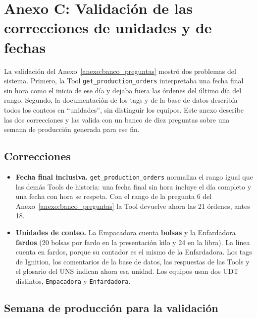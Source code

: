 \section*{Anexo C: Validación de las correcciones de unidades y de fechas}
{}
\makeatletter{}\makeatother
\label{anexo:validacion_correcciones}

\begin{singlespace}
\setlength{\parskip}{0.5em}

La validación del Anexo~\ref{anexo:banco_preguntas} mostró dos problemas del sistema. Primero, la Tool \texttt{get\_production\_orders} interpretaba una fecha final sin hora como el inicio de ese día y dejaba fuera las órdenes del último día del rango. Segundo, la documentación de los tags y de la base de datos describía todos los conteos en ``unidades'', sin distinguir los equipos. Este anexo describe las dos correcciones y las valida con un banco de diez preguntas sobre una semana de producción generada para ese fin.

\subsection*{Correcciones}

\begin{itemize}
\item \textbf{Fecha final inclusiva.} \texttt{get\_production\_orders} normaliza el rango igual que las demás Tools de historia: una fecha final sin hora incluye el día completo y una fecha con hora se respeta. Con el rango de la pregunta 6 del Anexo~\ref{anexo:banco_preguntas} la Tool devuelve ahora las 21 órdenes, antes 18.
\item \textbf{Unidades de conteo.} La Empacadora cuenta \textbf{bolsas} y la Enfardadora \textbf{fardos} (20 bolsas por fardo en la presentación kilo y 24 en la libra). La línea cuenta en fardos, porque su contador es el mismo de la Enfardadora. Los tags de Ignition, los comentarios de la base de datos, las respuestas de las Tools y el glosario del UNS indican ahora esa unidad. Los equipos usan dos UDT distintos, \texttt{Empacadora} y \texttt{Enfardadora}.
\end{itemize}

\subsection*{Semana de producción para la validación}


\end{singlespace}
